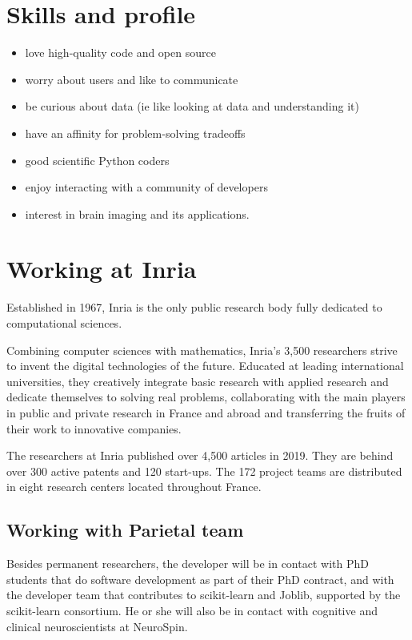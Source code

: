 \documentclass{article}
\begin{document}
\section*{Skills and profile}

\begin{itemize}
\item love high-quality code and open source
\item worry about users and like to communicate
\item be curious about data (ie like looking at data and understanding it)
\item have an affinity for problem-solving tradeoffs
\item good scientific Python coders
\item enjoy interacting with a community of developers
\item interest in brain imaging and its applications.
\end{itemize}


\section*{Working at Inria}
Established in 1967, Inria is the only public research body fully
dedicated to computational sciences.

Combining computer sciences with mathematics, Inria’s 3,500
researchers strive to invent the digital technologies of the
future. Educated at leading international universities, they
creatively integrate basic research with applied research and dedicate
themselves to solving real problems, collaborating with the main
players in public and private research in France and abroad and
transferring the fruits of their work to innovative companies.

The researchers at Inria published over 4,500 articles in 2019. They
are behind over 300 active patents and 120 start-ups. The 172 project
teams are distributed in eight research centers located throughout
France.

\subsection*{Working with Parietal team}
Besides permanent researchers, the developer will be in contact with
PhD students that do software development as part of their PhD
contract, and with the developer team that contributes to scikit-learn
and Joblib, supported by the scikit-learn consortium.
%
He or she will also be in contact with cognitive and clinical
neuroscientists at NeuroSpin.
\end{document}
